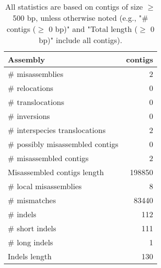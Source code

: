 \documentclass[12pt,a4paper]{article}
\begin{document}
\begin{table}[ht]
\begin{center}
\caption{All statistics are based on contigs of size $\geq$ 500 bp, unless otherwise noted (e.g., "\# contigs ($\geq$ 0 bp)" and "Total length ($\geq$ 0 bp)" include all contigs).}
\begin{tabular}{|l*{1}{|r}|}
\hline
Assembly & contigs \\ \hline
\# misassemblies & 2 \\ \hline
\hspace{5mm}\# relocations & 0 \\ \hline
\hspace{5mm}\# translocations & 0 \\ \hline
\hspace{5mm}\# inversions & 0 \\ \hline
\hspace{5mm}\# interspecies translocations & 2 \\ \hline
\# possibly misassembled contigs & 0 \\ \hline
\# misassembled contigs & 2 \\ \hline
Misassembled contigs length & 198850 \\ \hline
\# local misassemblies & 8 \\ \hline
\# mismatches & 83440 \\ \hline
\# indels & 112 \\ \hline
\hspace{5mm}\# short indels & 111 \\ \hline
\hspace{5mm}\# long indels & 1 \\ \hline
Indels length & 130 \\ \hline
\end{tabular}
\end{center}
\end{table}
\end{document}
